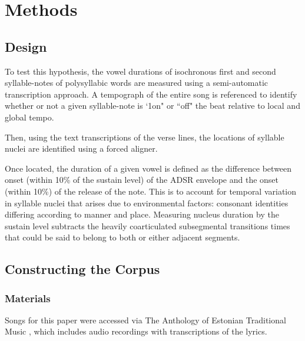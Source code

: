 \chapter{Methods}
%

\section{Design}
To test this hypothesis, the vowel durations of isochronous first and second syllable-notes of polysyllabic words are measured using a semi-automatic transcription approach. A tempograph of the entire song is referenced to identify whether or not a given syllable-note is `1on" or ``off" the beat relative to local and global tempo. 

Then, using the text transcriptions of the verse lines, the locations of syllable nuclei are identified using a forced aligner. 


Once located, the duration of a given vowel is defined as the difference between onset (within 10\% of the sustain level) of the ADSR envelope and the onset (within 10\%) of the release of the note. This is to account for temporal variation in syllable nuclei that arises due to environmental factors: consonant identities differing according to manner and place. Measuring nucleus duration by the sustain level subtracts the heavily coarticulated subsegmental transitions times that could be said to belong to both or either adjacent segments. 








%


\section{Constructing the Corpus}



\subsection{Materials}

Songs for this paper were accessed via The Anthology of Estonian Traditional Music \citep{tampere2016}, which includes audio recordings with transcriptions of the lyrics. 

